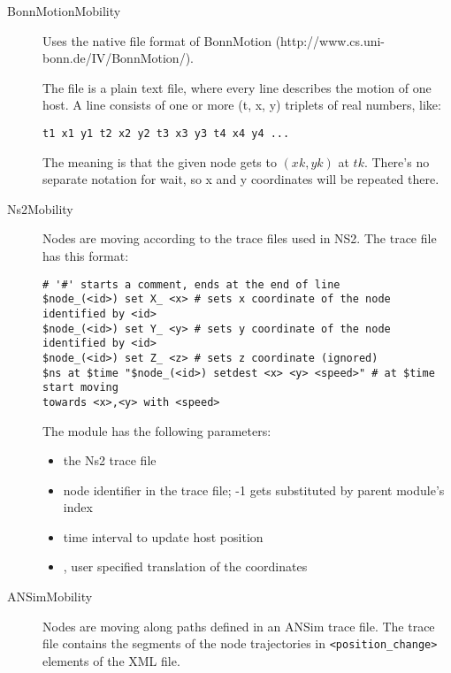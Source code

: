 \begin{description}

\item[BonnMotionMobility] Uses the native file format of BonnMotion
(http://www.cs.uni-bonn.de/IV/BonnMotion/).

The file is a plain text file, where every line describes the motion
of one host. A line consists of one or more (t, x, y) triplets of real
numbers, like:

\begin{verbatim}
t1 x1 y1 t2 x2 y2 t3 x3 y3 t4 x4 y4 ...
\end{verbatim}

The meaning is that the given node gets to $(xk,yk)$ at $tk$. There's no
separate notation for wait, so x and y coordinates will be repeated there.

\item[Ns2Mobility] Nodes are moving according to the trace files used
in NS2.
The trace file has this format:

\begin{verbatim}
# '#' starts a comment, ends at the end of line
$node_(<id>) set X_ <x> # sets x coordinate of the node identified by <id>
$node_(<id>) set Y_ <y> # sets y coordinate of the node identified by <id>
$node_(<id>) set Z_ <z> # sets z coordinate (ignored)
$ns at $time "$node_(<id>) setdest <x> <y> <speed>" # at $time start moving
towards <x>,<y> with <speed>
\end{verbatim}

The  module has the following parameters:

\begin{itemize}
  \item {} the Ns2 trace file
  \item {} node identifier in the trace file; -1 gets substituted by
  parent module's index
  \item {} time interval to update host position
  \item {}, user specified translation of the
  coordinates
\end{itemize}


\item[ANSimMobility]
Nodes are moving along paths defined in an ANSim trace file.
The trace file contains the segments of the node trajectories
in \verb!<position_change>! elements of the XML file.


\end{description}
